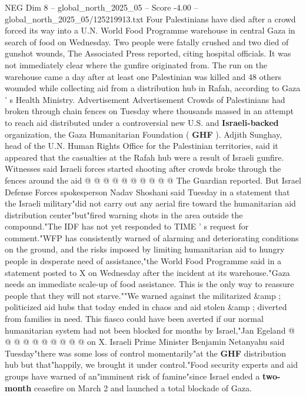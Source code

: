 \begin{textsample}{NEG Dim 8 – global\_north\_2025\_05 – Score -4.00 – global\_north\_2025\_05/125219913.txt}  \label{ex:f8_neg_052}
Four Palestinians have died after a crowd forced its way into a U.N.
World Food Programme warehouse in central Gaza in search of food on Wednesday.
Two people were fatally crushed and two died of gunshot wounds, The Associated Press reported, citing hospital officials.
It was not immediately clear where the gunfire originated from.
The run on the warehouse came a day after at least one Palestinian was killed and 48 others wounded while collecting aid from a distribution hub in Rafah, according to Gaza ' s Health Ministry.
Advertisement Advertisement Crowds of Palestinians had broken through chain fences on Tuesday where thousands massed in an attempt to reach aid distributed under a controversial new U.S. and \textbf{Israeli-backed} organization, the Gaza Humanitarian Foundation ( \textbf{GHF} ).
Adjith Sunghay, head of the U.N.
Human Rights Office for the Palestinian territories, said it appeared that the casualties at the Rafah hub were a result of Israeli gunfire.
Witnesses said Israeli forces started shooting after crowds broke through the fences around the aid @ @ @ @ @ @ @ @ @ @ The Guardian reported.
But Israel Defense Forces spokesperson Nadav Shoshani said Tuesday in a statement that the Israeli military"did not carry out any aerial fire toward the humanitarian aid distribution center"but"fired warning shots in the area outside the compound."The IDF has not yet responded to TIME ' s request for comment."WFP has consistently warned of alarming and deteriorating conditions on the ground, and the risks imposed by limiting humanitarian aid to hungry people in desperate need of assistance,"the World Food Programme said in a statement posted to X on Wednesday after the incident at its warehouse."Gaza needs an immediate scale-up of food assistance.
This is the only way to reassure people that they will not starve.""We warned against the militarized \&amp ; politicized aid hubs that today ended in chaos and aid stolen \&amp ; diverted from families in need.
This fiasco could have been averted if our normal humanitarian system had not been blocked for months by Israel,"Jan Egeland @ @ @ @ @ @ @ @ @ @ on X.
Israeli Prime Minister Benjamin Netanyahu said Tuesday"there was some loss of control momentarily"at the \textbf{GHF} distribution hub but that"happily, we brought it under control."Food security experts and aid groups have warned of an"imminent risk of famine"since Israel ended a \textbf{two-month} ceasefire on March 2 and launched a total blockade of Gaza.

\end{textsample}

